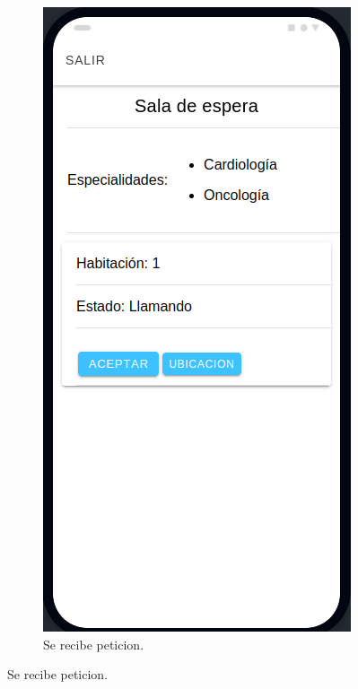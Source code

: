 \begin{figure}[!htpb]
     \centering
     \begin{subfigure}[b]{0.3\textwidth}
         \centering
         \includegraphics[width=.95\textwidth]{./Figures/app/enfermera-peticion.png}
         \caption{Se recibe peticion.}
         \label{fig:1de3}
     \end{subfigure}

\end{figure}
